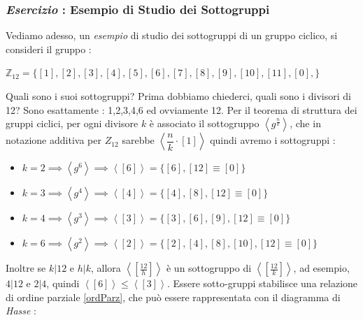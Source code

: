 \documentclass[12pt, letterpaper]{article}
\newcommand{\Z}{{\mathbb Z}}
\begin{document}
\subsubsection{\textit{Esercizio} : Esempio di Studio dei Sottogruppi}
Vediamo adesso, un \textit{esempio} di studio dei sottogruppi di un gruppo ciclico, si consideri il gruppo :\begin{center}
    \(\Z_{12}=\{[1],[2],[3],[4],[5],[6],[7],[8],[9],[10],[11],[0],\}\)
\end{center}
Quali sono i suoi sottogruppi? Prima dobbiamo chiederci, quali sono i divisori di 12? Sono 
esattamente : 1,2,3,4,6 ed ovviamente 12. Per il teorema di struttura dei gruppi ciclici, per ogni divisore 
\(k\) è associato il sottogruppo \(\left\langle g^{\frac{n}{k}}\right\rangle\), che in notazione additiva 
per \(Z_12\) sarebbe \(\left\langle \dfrac{n}{k}\cdot [1]\right\rangle\) quindi avremo i sottogruppi : 
\begin{itemize}
    \item \(k=2\implies \left\langle g^{6}\right\rangle\implies \left\langle [6]\right\rangle=\{[6],[12]\equiv[0]\}\)
    \item \(k=3\implies \left\langle g^{4}\right\rangle\implies \left\langle [4]\right\rangle=\{[4],[8],[12]\equiv[0]\}\)
    \item \(k=4\implies \left\langle g^{3}\right\rangle\implies \left\langle [3]\right\rangle=\{[3],[6],[9],[12]\equiv[0]\}\)
    \item \(k=6\implies \left\langle g^{2}\right\rangle\implies \left\langle [2]\right\rangle=\{[2],[4],[8],[10],[12]\equiv[0]\}\)
\end{itemize}
Inoltre se \(k|12\) e \(h|k\), allora \(\left\langle [\frac{12}{h}]\right\rangle\) è un sottogruppo 
di \(\left\langle [\frac{12}{k}]\right\rangle\), ad esempio, \(4|12\) e \(2|4\), quindi 
\(\left\langle [6]\right\rangle\le\left\langle [3]\right\rangle\). Essere sotto-gruppi stabilisce una relazione 
di ordine parziale \ref{ordParz}, che può essere rappresentata con il diagramma di \textit{Hasse} : 
\begin{figure}[h]
\end{figure}
\end{document}
